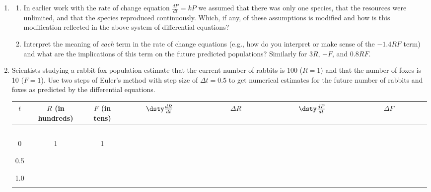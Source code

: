 \begin{enumerate}
\item \label{09problem1}
\begin{enumerate}
\item In earlier work with the rate of change equation $\frac{dP}{dt}=kP$  we assumed that there was only one species, that the resources were unlimited, and that the species reproduced continuously. Which, if any, of these assumptions is modified and how is this modification reflected in the above system of differential equations? \label{09problem1parta} \vfill

\item   Interpret the meaning of \emph{each} term in the rate of change equations (e.g., how do you interpret or make sense of the $-1.4RF$ term) and what are the implications of this term on the future predicted populations? Similarly for $3R$, $-F$, and $0.8RF$. \label{09problem1partb}
\vfill

\end{enumerate}
\item \label{09problem2}
Scientists studying a rabbit-fox population estimate that the current number of rabbits is 100 ($R=1$) and that the number of foxes is 10 ($F=1$). Use two steps of Euler's method with step size of $\Delta t =0.5$ to get numerical estimates for the future number of rabbits and foxes as predicted by the differential equations. \label{09problem2parta}

\begin{tabular}{|c|c|c|c|c|c|c|}
\hline
 $t$	& $R$ (in hundreds)	& $F$ (in tens) & $\dsty \frac{dR}{dt}$ & $\Delta R$ & $\dsty \frac{dF}{dt}$ & $\Delta F$ \\
 \hline
 & & & \ \ \ \ \ \ \ \ \ \ \ \ \ \ \ \ \ \ \ \ &  \ \ \ \ \ \ \ \ \ \ \ \ \ \ \ \ \ \ \ \  &  \ \ \ \ \ \ \ \ \ \ \ \ \ \ \ \ \ \ \ \  &  \ \ \ \ \ \ \ \ \ \ \ \ \ \ \ \ \ \ \ \ \\ 
0 & 1 & 1& & & & \\
&  & & & & & \\
\hline
&  & & & & & \\
0.5 & & & & & & \\
&  & & & & & \\
\hline
&  & & & & & \\
1.0 & & & & & &\\
&  & & & & & \\
\hline		
\end{tabular}
\vfill



\end{enumerate}
